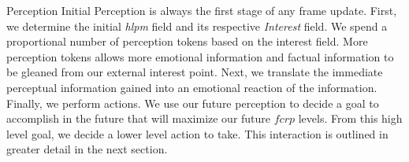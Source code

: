 \documentclass[11pt]{article}
\begin{document}
\begin{section}{Perception}
Initial Perception is always the first stage of any frame update. First, we determine the initial \emph{hlpm} field and its respective \emph{Interest} field. We spend a proportional number of perception tokens based on the interest field. More perception tokens allows more emotional information and factual information to be gleaned from our external interest point. Next, we translate the immediate perceptual information gained into an emotional reaction of the information. Finally, we perform actions. We use our future perception to decide a goal to accomplish in the future that will maximize our future $fcrp$ levels. From this high level goal, we decide a lower level action to take. This interaction is outlined in greater detail in the next section.





\end{section}
\end{document}
